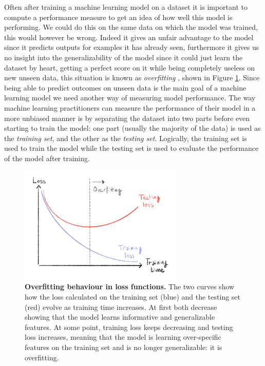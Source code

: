 \documentclass[
  11pt,
  twoside,
  BCOR=10mm,
  listof=totoc]{scrbook}
\newcommand{\extcaption}[2]{
    \caption[#1]{
        \textbf{#1}\newline
        #2
    }
}
\begin{document}
Often after training a machine learning model on a dataset it is important to compute a performance measure to get an idea of how well this model is performing. We could do this on the same data on which the model was trained, this would however be wrong. Indeed it gives an unfair advantage to the model since it predicts outputs for examples it has already seen, furthermore it gives us no insight into the generalizability of the model since it could just learn the dataset by heart, getting a perfect score on it while being completely useless on new unseen data, this situation is known as \emph{overfitting} \autocite{hastieElementsStatisticalLearning2009}, shown in Figure \ref{fig:overfitting}. Since being able to predict outcomes on unseen data is the main goal of a machine learning model we need another way of measuring model performance. The way machine learning practitioners can measure the performance of their model in a more unbiased manner is by separating the dataset into two parts before even starting to train the model: one part (usually the majority of the data) is used as the \emph{training set}, and the other as the \emph{testing set}. Logically, the training set is used to train the model while the testing set is used to evaluate the performance of the model after training.

\begin{figure}
\centering
\includegraphics[width=0.7\textwidth]{figures/Encode-seqs/Overfitting.png}
\extcaption{Overfitting behaviour in loss functions.}{The two curves show how the loss calculated on the training set (blue) and the testing set (red) evolve as training time increases. At first both decrease showing that the model learns informative and generalizable features. At some point, training loss keeps decreasing and testing loss increases, meaning that the model is learning over-specific features on the training set and is no longer generalizable: it is overfitting.}
\label{fig:overfitting}
\end{figure}
\end{document}
